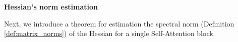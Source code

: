 \documentclass{article}
\begin{document}


\textbf{Hessian's norm estimation}

Next, we introduce a theorem for estimation the spectral norm (Definition \ref{def:matrix_norms}) of the Hessian for a single Self-Attention block.
\end{document}
